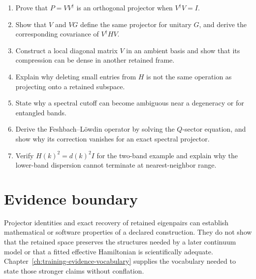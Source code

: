 \begin{enumerate}
  \item Prove that \(P=VV^{\dagger}\) is an orthogonal projector when
        \(V^{\dagger}V=I\).
  \item Show that \(V\) and \(VG\) define the same projector for unitary \(G\),
        and derive the corresponding covariance of \(V^{\dagger}HV\).
  \item Construct a local diagonal matrix \(V\) in an ambient basis and show
        that its compression can be dense in another retained frame.
  \item Explain why deleting small entries from \(H\) is not the same operation
        as projecting onto a retained subspace.
  \item State why a spectral cutoff can become ambiguous near a degeneracy or
        for entangled bands.
  \item Derive the Feshbach--L\"owdin operator by solving the \(Q\)-sector
        equation, and show why its correction vanishes for an exact spectral
        projector.
  \item Verify \(H(k)^2=d(k)^2I\) for the two-band example and explain why the
        lower-band dispersion cannot terminate at nearest-neighbor range.
\end{enumerate}

\section{Evidence boundary}

Projector identities and exact recovery of retained eigenpairs can establish
mathematical or software properties of a declared construction. They do not
show that the retained space preserves the structures needed by a later
continuum model or that a fitted effective Hamiltonian is scientifically
adequate. Chapter~\ref{ch:training-evidence-vocabulary} supplies the vocabulary
needed to state those stronger claims without conflation.

